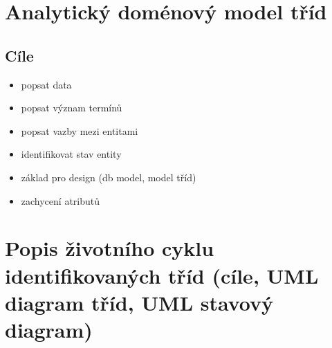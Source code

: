 \documentclass{szzclass}
\author{Jakub Rathouský}
\begin{document}
\tableofcontents
\newpage

\section{Analytický doménový model tříd}
\subsection{Cíle}
\begin{itemize}
    \item popsat data
    \item popsat význam termínů
    \item popsat vazby mezi entitami
    \item identifikovat stav entity
    \item základ pro design (db model, model tříd)
    \item zachycení atributů
\end{itemize}

\section{Popis životního cyklu identifikovaných tříd (cíle, UML diagram tříd, UML stavový diagram)}
\end{document}
